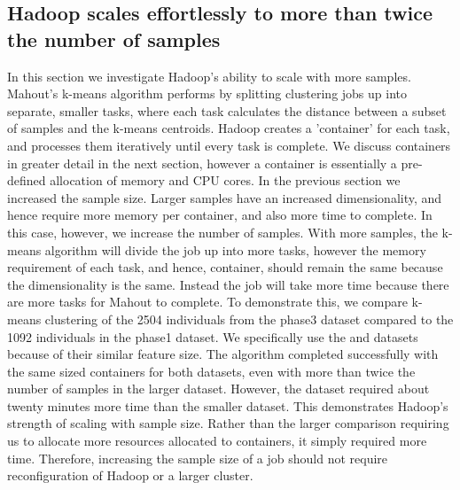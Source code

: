\documentclass{bioinfo}
\begin{document}
\subsection*{Hadoop scales effortlessly to more than twice the number of samples}

In this section we investigate Hadoop's ability to scale with more samples. Mahout's k-means algorithm performs by splitting clustering jobs up into separate, smaller tasks, where each task calculates the distance between a subset of samples and the k-means centroids.
Hadoop creates a 'container' for each task, and processes them iteratively until every task is complete.
We discuss containers in greater detail in the next section, however a container is essentially a pre-defined allocation of memory and CPU cores.
In the previous section we increased the sample size. Larger samples have an increased dimensionality, and hence require more memory per container, and also more time to complete.
In this case, however, we increase the number of samples. With more samples, the k-means algorithm will divide the job up into more tasks, however the memory requirement of each task, and hence, container, should remain the same because the dimensionality is the same.
Instead the job will take more time because there are more tasks for Mahout to complete.
To demonstrate this, we compare k-means clustering of the 2504 individuals from the phase3 dataset compared to the 1092 individuals in the phase1 dataset.
We specifically use the \SevenPhaseone{} and \ThreePhasethree{} datasets because of their similar feature size.
The algorithm completed successfully with the same sized containers for both datasets, even with more than twice the number of samples in the larger dataset.
However, the \ThreePhasethree{} dataset required about twenty minutes more time than the smaller \SevenPhaseone{} dataset.
This demonstrates Hadoop's strength of scaling with sample size. Rather than the larger comparison requiring us to allocate more resources allocated to containers, it simply required more time. Therefore, increasing the sample size of a job should not require reconfiguration of Hadoop or a larger cluster.
\end{document}
